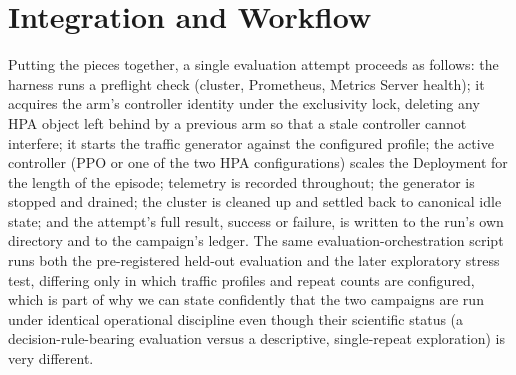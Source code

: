 \section{Integration and Workflow}

Putting the pieces together, a single evaluation attempt proceeds as
follows: the harness runs a preflight check (cluster, Prometheus, Metrics
Server health); it acquires the arm's controller identity under the
exclusivity lock, deleting any HPA object left behind by a previous arm so
that a stale controller cannot interfere; it starts the traffic generator
against the configured profile; the active controller (PPO or one of the
two HPA configurations) scales the Deployment for the length of the
episode; telemetry is recorded throughout; the generator is stopped and
drained; the cluster is cleaned up and settled back to canonical idle
state; and the attempt's full result, success or failure, is written to the
run's own directory and to the campaign's ledger. The same
evaluation-orchestration script runs both the pre-registered held-out
evaluation and the later exploratory stress test,
differing only in which traffic profiles and repeat counts are configured,
which is part of why we can state confidently that the two campaigns are
run under identical operational discipline even though their scientific
status (a decision-rule-bearing evaluation versus a descriptive,
single-repeat exploration) is very different.

